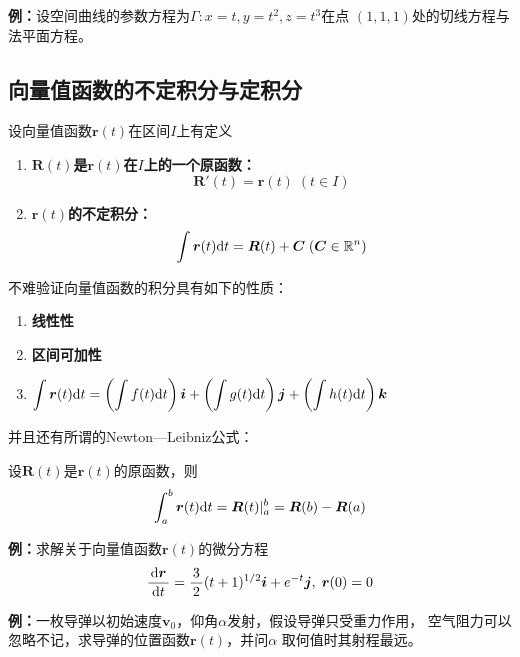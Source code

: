 {\bf 例：}设空间曲线的参数方程为$\Gamma:x=t,y=t^2,z=t^3$在点
$(1,1,1)$处的切线方程与法平面方程。

\subsection{向量值函数的不定积分与定积分}

\begin{thx}
	设向量值函数$\bm{r}(t)$在区间$I$上有定义 
	\begin{enumerate}
	  \item {\bf $\bm{R}(t)$是$\bm{r}(t)$在$I$上的一个原函数：} 
	  $$\bm{R}'(t)=\bm{r}(t)\;(t\in I)$$ 
	  \item {\bf $\bm{r}(t)$的不定积分：}
	  $$\displaystyle\int \bm{r}(t)\mathrm{d} t=\bm{R}(t)+\bm{C}\;(\bm{C}\in\mathbb{R}^n)$$
	\end{enumerate}
\end{thx}

不难验证向量值函数的积分具有如下的性质：
\begin{enumerate}
  \setlength{\itemindent}{1cm}
  \item {\bf 线性性} 
  \item {\bf 区间可加性} 
  \item $\displaystyle\int\bm{r}(t)\mathrm{d} t=\left(\displaystyle\int f(t)\mathrm{d} t\right)\bm{i}
  +\left(\displaystyle\int g(t)\mathrm{d} t\right)\bm{j}+\left(\displaystyle\int h(t)\mathrm{d} t\right)\bm{k}$ 
\end{enumerate}

并且还有所谓的Newton—Leibniz公式：
\begin{thx}
	设$\bm{R}(t)$是$\bm{r}(t)$的原函数，则
	$$\displaystyle\int_a^b\bm{r}(t)\mathrm{d} t=\bm{R}(t)|_a^b=\bm{R}(b)-\bm{R}(a)$$
\end{thx}

{\bf 例：}求解关于向量值函数$\bm{r}(t)$的微分方程
$$\displaystyle\frac{\,{\mathrm{d}\bm{r}}\,}{\,{\mathrm{d} t}\,}=\displaystyle\frac{\,{3}\,}{\,{2}\,}(t+1)^{1/2}\bm{i}+e^{-t}\bm{j},\;\bm{r}(0)=0$$

{\bf 例：}一枚导弹以初始速度$\bm{v}_0$，仰角$\alpha$发射，假设导弹只受重力作用，
空气阻力可以忽略不记，求导弹的位置函数$\bm{r}(t)$，并问$\alpha$
取何值时其射程最远。

